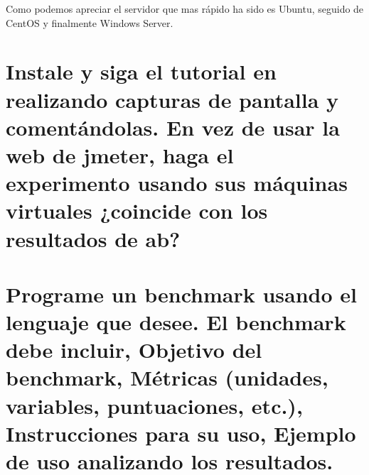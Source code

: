Como podemos apreciar el servidor que mas rápido ha sido es Ubuntu, seguido de CentOS y finalmente Windows Server.





\section[Cuestión 4]{Instale y siga el tutorial en	 realizando capturas de pantalla y comentándolas. En vez de usar la web de jmeter, haga el experimento usando sus máquinas virtuales ¿coincide con los resultados de ab?}

\section[Cuestión 5]{ Programe un benchmark usando el lenguaje que desee. El benchmark debe incluir, Objetivo del benchmark, Métricas (unidades, variables, puntuaciones, etc.), Instrucciones para su uso, Ejemplo de uso analizando los resultados.}




\grid
